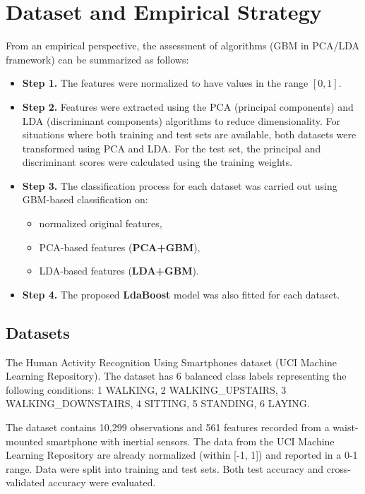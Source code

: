 \documentclass[11pt,a4paper]{article}
\begin{document}
\section{Dataset and Empirical Strategy}
From an empirical perspective, the assessment of algorithms (GBM in PCA/LDA framework) can be summarized as follows:

\begin{itemize}
    \item \textbf{Step 1.} The features were normalized to have values in the range $[0,1]$.

    \item \textbf{Step 2.} Features were extracted using the PCA (principal components) and LDA (discriminant components) algorithms to reduce dimensionality.  
    For situations where both training and test sets are available, both datasets were transformed using PCA and LDA.  
    For the test set, the principal and discriminant scores were calculated using the training weights.

    \item \textbf{Step 3.} The classification process for each dataset was carried out using GBM-based classification on:
    \begin{itemize}
        \item normalized original features,
        \item PCA-based features (\textbf{PCA+GBM}),
        \item LDA-based features (\textbf{LDA+GBM}).
    \end{itemize}

    \item \textbf{Step 4.} The proposed \textbf{LdaBoost} model was also fitted for each dataset.
\end{itemize}


\subsection*{Datasets}
The Human Activity Recognition Using Smartphones dataset (UCI Machine Learning Repository). The dataset has 6 balanced class labels representing the following conditions: 1 WALKING, 2 WALKING\_UPSTAIRS, 3 WALKING\_DOWNSTAIRS, 4 SITTING, 5 STANDING, 6 LAYING.

The dataset contains 10,299 observations and 561 features recorded from a waist-mounted smartphone with inertial sensors. The data from the UCI Machine Learning Repository are already normalized (within [-1, 1]) and reported in a 0-1 range. Data were split into training and test sets. Both test accuracy and cross-validated accuracy were evaluated.
\end{document}
